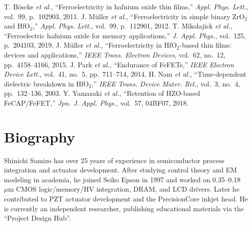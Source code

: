 \documentclass[conference]{IEEEtran}
\newcommand{\um}{\ensuremath{\mu\mathrm{m}}}
\begin{document}
\begin{thebibliography}{00}
T. Böscke \textit{et al.}, “Ferroelectricity in hafnium oxide thin films,” \textit{Appl. Phys. Lett.}, vol.~99, p.~102903, 2011.
J. Müller \textit{et al.}, “Ferroelectricity in simple binary ZrO$_2$ and HfO$_2$,” \textit{Appl. Phys. Lett.}, vol.~99, p.~112901, 2012.
T. Mikolajick \textit{et al.}, “Ferroelectric hafnium oxide for memory applications,” \textit{J. Appl. Phys.}, vol.~125, p.~204103, 2019.
J. Müller \textit{et al.}, “Ferroelectricity in HfO$_2$-based thin films: devices and applications,” \textit{IEEE Trans. Electron Devices}, vol.~62, no.~12, pp.~4158--4166, 2015.
J. Park \textit{et al.}, “Endurance of FeFETs,” \textit{IEEE Electron Device Lett.}, vol.~41, no.~5, pp.~711--714, 2014.
H. Nam \textit{et al.}, “Time-dependent dielectric breakdown in HfO$_2$,” \textit{IEEE Trans. Device Mater. Rel.}, vol.~3, no.~4, pp.~132--136, 2003.
Y. Yamazaki \textit{et al.}, “Retention of HZO-based FeCAP/FeFET,” \textit{Jpn. J. Appl. Phys.}, vol.~57, 04BF07, 2018.
\end{thebibliography}

\section*{Biography}
Shinichi Samizo has over 25 years of experience in semiconductor process integration and actuator development. After studying control theory and EM modeling in academia, he joined Seiko Epson in 1997 and worked on 0.35--0.18~\um{} CMOS logic/memory/HV integration, DRAM, and LCD drivers. Later he contributed to PZT actuator development and the PrecisionCore inkjet head. He is currently an independent researcher, publishing educational materials via the “Project Design Hub”.
\end{document}
